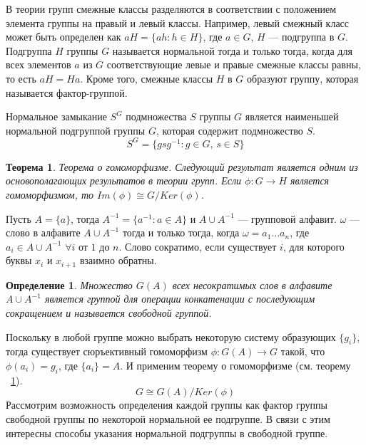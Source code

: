 \documentclass[14pt]{matmex-diploma-custom}
\newtheorem{thm}{Теорема}[subsection]
\newtheorem{defn}{Определение}[subsection]
\begin{document}
В теории групп смежные классы разделяются в соответствии с положением элемента группы
на правый и левый классы. 
Например, левый смежный класс может быть определен как $aH = \{ah: h \in H \}$,
где $ a \in G $, $ H $ --- подгруппа в $G$.
Подгруппа $ H $ группы $ G $ называется нормальной тогда и только тогда, когда для всех
элементов $ a $ из $ G $ соответствующие левые и правые смежные классы равны,
то есть $ aH = Ha $. Кроме того, смежные классы $ H $ в $ G $ образуют группу, которая
называется фактор-группой.

Нормальное замыкание $ S^G $ подмножества $ S $ группы $ G $ является наименьшей нормальной подгруппой
группы $ G $, которая содержит подмножество $ S $.
\begin{equation}
    S^G = \{ gsg^{-1} : g \in G,\, s \in S \}
\end{equation}

\begin{thm} \label{gomomorphThm}
Теорема о гомоморфизме.
Следующий результат является одним из основополагающих результатов в теории групп.
Если $ \phi: G \to H $ является гомоморфизмом, то $ Im (\phi) \cong G/Ker (\phi) $.
\end{thm}

Пусть $ A = \{a\} $, тогда $ A^{-1} = \{a^{-1}: a \in A\} $ и $ A \cup A^{-1} $ --- групповой алфавит.
$ \omega $ --- слово в алфавите $ A \cup A^{-1} $ тогда и только тогда, когда $\omega = a_1 \dots a_n$,
где $ a_i \in A \cup A^{-1}$ $\forall i$ от $1$ до $n$.
Слово сократимо, если существует $ i $, для которого буквы $ x_i $ и $ x_{i + 1} $ взаимно обратны.

\begin{defn}
Множество $ G (A) $ всех несократимых слов в алфавите $ A \cup A^{-1} $
является группой для операции конкатенации с последующим сокращением и называется свободной группой.
\end{defn}

Поскольку в любой группе можно выбрать некоторую систему образующих $ \{g_i \} $, тогда существует
сюръективный гомоморфизм $ \phi: G (A) \to G $ такой, что $ \phi (a_i) = g_i $,
где $ \{a_i \} = A $. И применим теорему о гомоморфизме (см. теорему ~\ref{gomomorphThm}).
\begin{equation}
  G \cong G (A) / Ker (\phi)  
\end{equation}
Рассмотрим возможность определения каждой группы
как фактор группы свободной группы по некоторой нормальной ее подгруппе.
В связи с этим интересны способы указания нормальной подгруппы в свободной группе.
\end{document}
